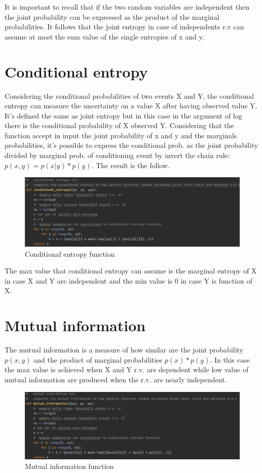 \documentclass[12pt]{report}
\begin{document}
It is important to recall that if the two random variables are independent then the joint probability can be expressed as the product of the marginal probabilities. It follows that the joint entropy in case of independents r.v can assume at most the sum value of the single entropies of x and y.

\section{Conditional entropy}
Considering the conditional probabilities of two events X and Y, the conditional entropy can measure the uncertainty on a value X after having observed value Y. It's defined the same as joint entropy but in this case in the argument of log there is the conditional probability of X observed Y. Considering that the function accept in input the joint probability of x and y and the marginals probabilities, it's possible to express the conditional prob. as the joint probability divided by marginal prob. of conditioning event by invert the chain rule:  $p(x,y) = p(x|y) * p(y) $. The result is the follow.
\begin{figure}[h!]
    \centering
    \includegraphics[width=14cm]{Pictures/Conditional entropy.png}
    \caption{Conditional entropy function}
\end{figure}

The max value that conditional entropy can assume is the marginal entropy of X in case X and Y are independent and the min value is 0 in case Y is function of X.

\section{Mutual information}
The mutual information is a measure of how similar are the joint probability $p(x,y)$ and the product of marginal probabilities $p(x) * p(y) $. In this case the max value is achieved when X and Y r.v. are dependent while low value of mutual information are produced when the r.v. are nearly independent.

\begin{figure}[h!]
    \centering
    \includegraphics[width=14cm]{Pictures/Mutual information.png}
    \caption{Mutual information function}
\end{figure}
\end{document}
